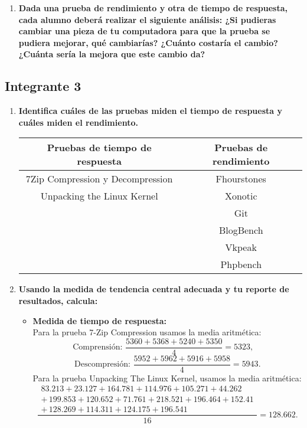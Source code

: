 \documentclass[12pt]{article}
\newcommand{\pl}[1]{\item \textbf{ #1 }}
\begin{document}
\begin{enumerate}[label=(\arabic{section}.\arabic{subsection}.\arabic{enumi})]
    \pl{Dada una prueba de rendimiento y otra de tiempo de respuesta, cada alumno deberá realizar el siguiente análisis: ¿Si pudieras cambiar una pieza de tu computadora para que la prueba se pudiera mejorar, qué cambiarías? ¿Cuánto costaría el cambio? ¿Cuánta sería la mejora que este cambio da?}

\end{enumerate}

\subsection{Integrante 3}

\begin{enumerate}[label=(\arabic{section}.\arabic{subsection}.\arabic{enumi})]
    \pl{Identifica cuáles de las pruebas miden el tiempo de respuesta y cuáles miden el rendimiento.}
    \begin{table}[htb]
        \centering
        \begin{tabular}{|c|c|}
        \hline
        Pruebas de tiempo de respuesta & Pruebas de rendimiento \\
        \hline
        7Zip Compression y Decompression & Fhourstones \\
        \hline
        Unpacking the Linux Kernel & Xonotic \\
        \hline
         & Git \\
        \hline
        & BlogBench \\
        \hline
        & Vkpeak \\
        \hline
        & Phpbench \\
        \hline
        \end{tabular}
    \end{table}\par

    \pl{Usando la medida de tendencia central adecuada y tu reporte de resultados, calcula:}
    \begin{itemize}
       \item \textbf{Medida de tiempo de respuesta:} \\
       Para la prueba 7-Zip Compression usamos la media aritmética:
       \[
       \text{Comprensión: } \frac{5360+5368+5240+5350}{4}=5323,\quad
       \]
       \[
       \text{Descompresión: } \frac{5952+5962+5916+5958}{4}=5943.
       \]
       Para la prueba Unpacking The Linux Kernel, usamos la media aritmética:
       \[
       \frac{
       	\begin{split}
       		83.213 + 23.127 + 164.781 + 114.976 + 105.271 + 44.262 \\
       		+\, 199.853 + 120.652 + 71.761 + 218.521 + 196.464 + 152.41 \\
       		+\, 128.269 + 114.311 + 124.175 + 196.541
       	\end{split}
       }{16} = 128.662.
       \]
       

\end{itemize}
\end{enumerate}
\end{document}
